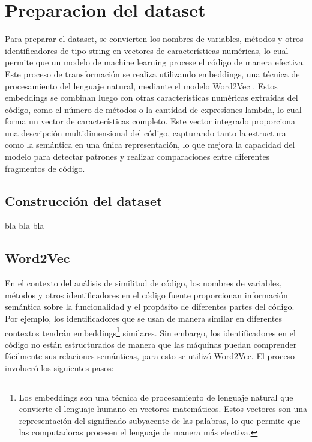 \chapter{Preparacion del dataset}\label{chapter:proposal}

Para preparar el dataset, se convierten los nombres de variables, métodos y otros identificadores de tipo string en vectores de características numéricas, lo cual permite que un modelo de machine learning procese el código de manera efectiva. Este proceso de transformación se realiza utilizando embeddings, una técnica de procesamiento del lenguaje natural, mediante el modelo Word2Vec \cite{mikolov2013efficient}. Estos embeddings se combinan luego con otras características numéricas extraídas del código, como el número de métodos o la cantidad de expresiones lambda, lo cual forma un vector de características completo. Este vector integrado proporciona una descripción multidimensional del código, capturando tanto la estructura como la semántica en una única representación, lo que mejora la capacidad del modelo para detectar patrones y realizar comparaciones entre diferentes fragmentos de código.

\section{Construcción del dataset}
bla bla bla

\section{Word2Vec}

En el contexto del análisis de similitud de código, los nombres de variables, métodos y otros identificadores en el código fuente proporcionan información semántica sobre la funcionalidad y el propósito de diferentes partes del código. Por ejemplo, los identificadores que se usan de manera similar en diferentes contextos tendrán embeddings\footnote{Los embeddings son una técnica de procesamiento de lenguaje natural que convierte el lenguaje humano en vectores matemáticos. Estos vectores son una representación del significado subyacente de las palabras, lo que permite que las computadoras procesen el lenguaje de manera más efectiva.} similares. Sin embargo, los identificadores en el código no están estructurados de manera que las máquinas puedan comprender fácilmente sus relaciones semánticas, para esto se utilizó Word2Vec. El proceso involucró los siguientes pasos:

